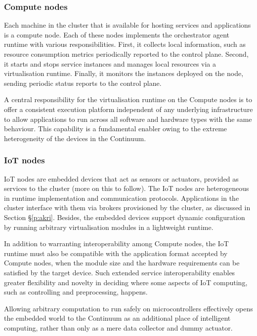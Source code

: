 \subsubsection{Compute nodes}

Each machine in the cluster that is available for hosting services and applications is a compute node. Each of these nodes implements the orchestrator agent runtime with various responsibilities. First, it collects local information, such as resource consumption metrics periodically reported to the control plane. Second, it starts and stops service instances and manages local resources via a virtualisation runtime. Finally, it monitors the instances deployed on the node, sending periodic status reports to the control plane.

A central responsibility for the virtualisation runtime on the Compute nodes is to offer a consistent execution platform independent of any underlying infrastructure to allow applications to run across all software and hardware types with the same behaviour. This capability is a fundamental enabler owing to the extreme heterogeneity of the devices in the Continuum.

\subsubsection{IoT nodes}

IoT nodes are embedded devices that act as sensors or actuators, provided as services to the cluster (more on this to follow). The IoT nodes are heterogeneous in runtime implementation and communication protocols. Applications in the cluster interface with them via brokers provisioned by the cluster, as discussed in Section §\ref{p:akri}. Besides, the embedded devices support dynamic configuration by running arbitrary virtualisation modules in a lightweight runtime.

In addition to warranting interoperability among Compute nodes, the IoT runtime must also be compatible with the application format accepted by Compute nodes, when the module size and the hardware requirements can be satisfied by the target device. Such extended service interoperability enables greater flexibility and novelty in deciding where some aspects of IoT computing, such as controlling and preprocessing, happens. 

Allowing arbitrary computation to run safely on microcontrollers effectively opens the embedded world to the Continuum as an additional place of intelligent computing, rather than only as a mere data collector and dummy actuator.

